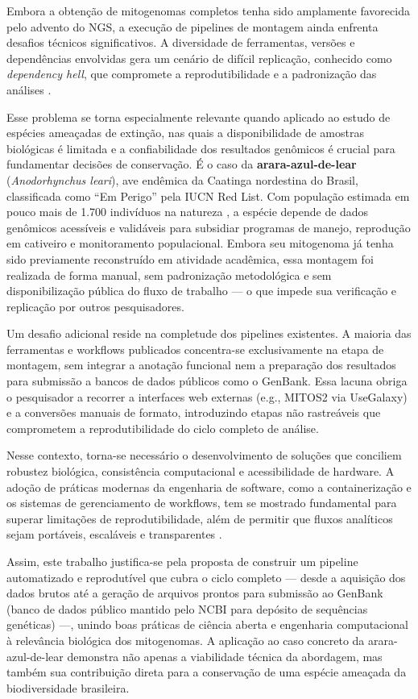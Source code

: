 Embora a obtenção de mitogenomas completos tenha sido amplamente favorecida pelo advento do NGS, a execução de pipelines de montagem ainda enfrenta desafios técnicos significativos. A diversidade de ferramentas, versões e dependências envolvidas gera um cenário de difícil replicação, conhecido como \textit{dependency hell}, que compromete a reprodutibilidade e a padronização das análises \cite{sandve2013,baker2016,gruning2018}.

Esse problema se torna especialmente relevante quando aplicado ao estudo de espécies ameaçadas de extinção, nas quais a disponibilidade de amostras biológicas é limitada e a confiabilidade dos resultados genômicos é crucial para fundamentar decisões de conservação. É o caso da \textbf{arara-azul-de-lear} (\textit{Anodorhynchus leari}), ave endêmica da Caatinga nordestina do Brasil, classificada como ``Em Perigo'' pela IUCN Red List. Com população estimada em pouco mais de 1.700 indivíduos na natureza \cite{icmbio2022}, a espécie depende de dados genômicos acessíveis e validáveis para subsidiar programas de manejo, reprodução em cativeiro e monitoramento populacional. Embora seu mitogenoma já tenha sido previamente reconstruído em atividade acadêmica, essa montagem foi realizada de forma manual, sem padronização metodológica e sem disponibilização pública do fluxo de trabalho --- o que impede sua verificação e replicação por outros pesquisadores.

Um desafio adicional reside na completude dos pipelines existentes. A maioria das ferramentas e workflows publicados concentra-se exclusivamente na etapa de montagem, sem integrar a anotação funcional nem a preparação dos resultados para submissão a bancos de dados públicos como o GenBank. Essa lacuna obriga o pesquisador a recorrer a interfaces web externas (e.g., MITOS2 via UseGalaxy) e a conversões manuais de formato, introduzindo etapas não rastreáveis que comprometem a reprodutibilidade do ciclo completo de análise.

Nesse contexto, torna-se necessário o desenvolvimento de soluções que conciliem robustez biológica, consistência computacional e acessibilidade de hardware. A adoção de práticas modernas da engenharia de software, como a containerização e os sistemas de gerenciamento de workflows, tem se mostrado fundamental para superar limitações de reprodutibilidade, além de permitir que fluxos analíticos sejam portáveis, escaláveis e transparentes \cite{ditommaso2017,ewels2020}.

Assim, este trabalho justifica-se pela proposta de construir um pipeline automatizado e reprodutível que cubra o ciclo completo --- desde a aquisição dos dados brutos até a geração de arquivos prontos para submissão ao GenBank (banco de dados público mantido pelo NCBI para depósito de sequências genéticas) ---, unindo boas práticas de ciência aberta e engenharia computacional à relevância biológica dos mitogenomas. A aplicação ao caso concreto da arara-azul-de-lear demonstra não apenas a viabilidade técnica da abordagem, mas também sua contribuição direta para a conservação de uma espécie ameaçada da biodiversidade brasileira.

